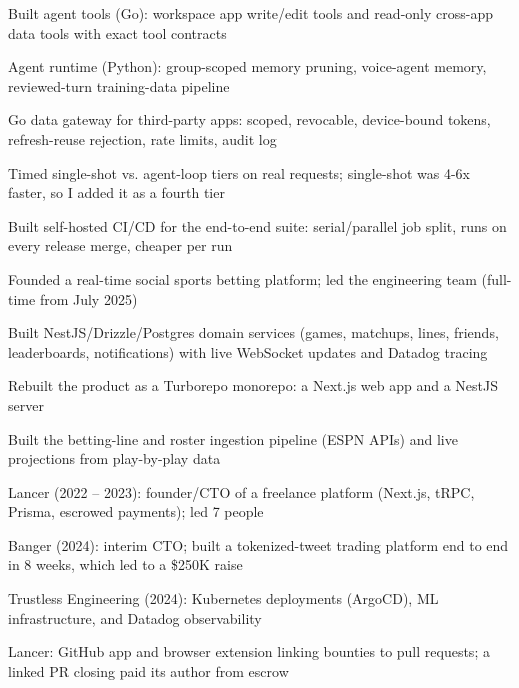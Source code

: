 \documentclass[print]{jack-resume}
\begin{document}
\begin{tightemize}
    \item Built agent tools (Go): workspace app write/edit tools and read-only cross-app data tools with exact tool contracts
    \item Agent runtime (Python): group-scoped memory pruning, voice-agent memory, reviewed-turn training-data pipeline
    \item Go data gateway for third-party apps: scoped, revocable, device-bound tokens, refresh-reuse rejection, rate limits, audit log
    \item Timed single-shot vs. agent-loop tiers on real requests; single-shot was 4-6x faster, so I added it as a fourth tier
    \item Built self-hosted CI/CD for the end-to-end suite: serial/parallel job split, runs on every release merge, cheaper per run
\end{tightemize}
\sectionsep

\begin{tightemize}
    \item Founded a real-time social sports betting platform; led the engineering team (full-time from July 2025)
    \item Built NestJS/Drizzle/Postgres domain services (games, matchups, lines, friends, leaderboards, notifications) with live WebSocket updates and Datadog tracing
    \item Rebuilt the product as a Turborepo monorepo: a Next.js web app and a NestJS server
    \item Built the betting-line and roster ingestion pipeline (ESPN APIs) and live projections from play-by-play data
\end{tightemize}
\sectionsep

\begin{tightemize}
    \item Lancer (2022 -- 2023): founder/CTO of a freelance platform (Next.js, tRPC, Prisma, escrowed payments); led 7 people
    \item Banger (2024): interim CTO; built a tokenized-tweet trading platform end to end in 8 weeks, which led to a \$250K raise
    \item Trustless Engineering (2024): Kubernetes deployments (ArgoCD), ML infrastructure, and Datadog observability
    \item Lancer: GitHub app and browser extension linking bounties to pull requests; a linked PR closing paid its author from escrow
\end{tightemize}
\sectionsep
\end{document}

